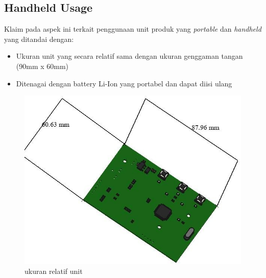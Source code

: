 \documentclass[12pt,]{article}
\begin{document}
	\newpage	
	\subsection{Handheld Usage}
	
	Klaim pada aspek ini terkait penggunaan unit produk yang \textit{portable}
	dan \textit{handheld} yang ditandai dengan:
	
	\begin{itemize}
		\item Ukuran unit yang secara relatif sama dengan ukuran genggaman 
		tangan (90mm x 60mm)
		
		\item Ditenagai dengan battery Li-Ion yang portabel dan dapat diisi 
		ulang
	\end{itemize}

	\begin{figure}[!ht]
		\centering
		\includegraphics[width=350pt]{images/size}
		\caption{ukuran relatif unit}
	\end{figure}
	
\end{document}
